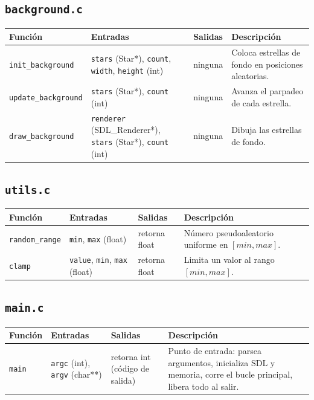 \documentclass[11pt]{article}
\begin{document}
\subsection*{\texttt{background.c}}
\begin{longtable}{L{4cm}L{4.1cm}L{2.2cm}L{3.7cm}}
\toprule
Función & Entradas & Salidas & Descripción \\
\midrule
\texttt{init\_background} & \texttt{stars} (Star*), \texttt{count}, \texttt{width}, \texttt{height} (int) & ninguna & Coloca estrellas de fondo en posiciones aleatorias. \\
\texttt{update\_background} & \texttt{stars} (Star*), \texttt{count} (int) & ninguna & Avanza el parpadeo de cada estrella. \\
\texttt{draw\_background} & \texttt{renderer} (SDL\_Renderer*), \texttt{stars} (Star*), \texttt{count} (int) & ninguna & Dibuja las estrellas de fondo. \\
\bottomrule
\end{longtable}

\subsection*{\texttt{utils.c}}
\begin{longtable}{L{4cm}L{4.1cm}L{2.2cm}L{3.7cm}}
\toprule
Función & Entradas & Salidas & Descripción \\
\midrule
\texttt{random\_range} & \texttt{min}, \texttt{max} (float) & retorna float & Número pseudoaleatorio uniforme en $[min, max]$. \\
\texttt{clamp} & \texttt{value}, \texttt{min}, \texttt{max} (float) & retorna float & Limita un valor al rango $[min, max]$. \\
\bottomrule
\end{longtable}

\subsection*{\texttt{main.c}}
\begin{longtable}{L{4cm}L{4.1cm}L{2.2cm}L{3.7cm}}
\toprule
Función & Entradas & Salidas & Descripción \\
\midrule
\texttt{main} & \texttt{argc} (int), \texttt{argv} (char**) & retorna int (código de salida) & Punto de entrada: parsea argumentos, inicializa SDL y memoria, corre el bucle principal, libera todo al salir. \\
\bottomrule
\end{longtable}
\end{document}
